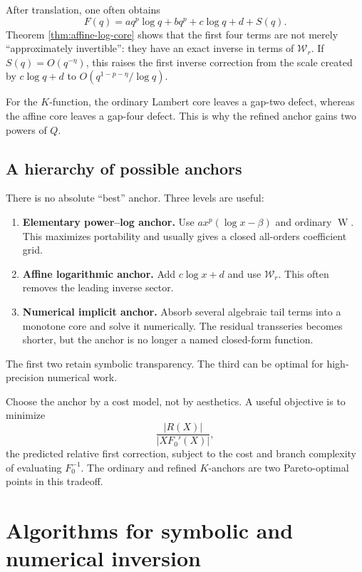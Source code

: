 \documentclass[11pt,oneside]{article}
\theoremstyle{plain}
\theoremstyle{definition}
\theoremstyle{remark}
\newcommand{\W}{\operatorname{W}}
\newcommand{\rW}{\mathcal{W}}
\begin{document}
After translation, one often obtains
\begin{equation}
 F(q)=a q^p\log q+bq^p+c\log q+d+S(q).
 \label{eq:affine-plus-tail}
\end{equation}
Theorem \ref{thm:affine-log-core} shows that the first four terms are not merely
``approximately invertible'': they have an exact inverse in terms of
\(\rW_r\).  If \(S(q)=O(q^{-\eta})\), this raises the first inverse correction
from the scale created by \(c\log q+d\) to
\(O(q^{1-p-\eta}/\log q)\).

For the \(K\)-function, the ordinary Lambert core leaves a gap-two defect,
whereas the affine core leaves a gap-four defect.  This is why the refined
anchor gains two powers of \(Q\).

\subsection{A hierarchy of possible anchors}

There is no absolute ``best'' anchor.  Three levels are useful:
\begin{enumerate}
\item \textbf{Elementary power--log anchor.}  Use
      \(a x^p(\log x-\beta)\) and ordinary \(\W\).  This maximizes portability
      and usually gives a closed all-orders coefficient grid.
\item \textbf{Affine logarithmic anchor.}  Add \(c\log x+d\) and use
      \(\rW_r\).  This often removes the leading inverse sector.
\item \textbf{Numerical implicit anchor.}  Absorb several algebraic tail terms
      into a monotone core and solve it numerically.  The residual transseries
      becomes shorter, but the anchor is no longer a named closed-form
      function.
\end{enumerate}
The first two retain symbolic transparency.  The third can be optimal for
high-precision numerical work.

\begin{methodbox}
Choose the anchor by a cost model, not by aesthetics.  A useful objective is to
minimize
\[
 \frac{|R(X)|}{|XF_0'(X)|},
\]
the predicted relative first correction, subject to the cost and branch
complexity of evaluating \(F_0^{-1}\).  The ordinary and refined \(K\)-anchors
are two Pareto-optimal points in this tradeoff.
\end{methodbox}

\section{Algorithms for symbolic and numerical inversion}
\label{sec:algorithms}
\end{document}
